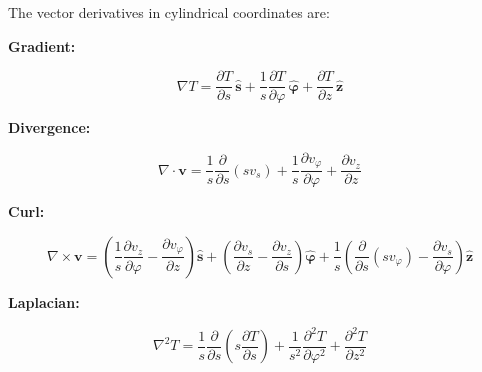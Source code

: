 \documentclass[12pt]{book}
\begin{document}
The vector derivatives in cylindrical coordinates are:

\textbf{Gradient:}

\[
\nabla T = \frac{\partial T}{\partial s} \, \mathbf{\hat{s}} + \frac{1}{s} \frac{\partial T}{\partial \varphi} \, \mathbf{\hat{\varphi}} + \frac{\partial T}{\partial z} \, \mathbf{\hat{z}}
\]

\textbf{Divergence:}

\[
\nabla \cdot \mathbf{v} = \frac{1}{s} \frac{\partial}{\partial s} (s v_s) + \frac{1}{s} \frac{\partial v_{\varphi}}{\partial \varphi} + \frac{\partial v_{z}}{\partial z}
\]

\textbf{Curl:}

\[
\nabla \times \mathbf{v} = \left( \frac{1}{s} \frac{\partial v_{z}}{\partial \varphi} - \frac{\partial v_{\varphi}}{\partial z} \right) \mathbf{\hat{s}} + \left( \frac{\partial v_{s}}{\partial z} - \frac{\partial v_{z}}{\partial s} \right) \mathbf{\hat{\varphi}} + \frac{1}{s} \left( \frac{\partial}{\partial s} (s v_{\varphi}) - \frac{\partial v_{s}}{\partial \varphi} \right) \mathbf{\hat{z}}
\]

\textbf{Laplacian:}

\[
\nabla^2 T = \frac{1}{s} \frac{\partial}{\partial s} \left( s \frac{\partial T}{\partial s} \right) + \frac{1}{s^2} \frac{\partial^2 T}{\partial \varphi^2} + \frac{\partial^2 T}{\partial z^2}
\]
\end{document}
